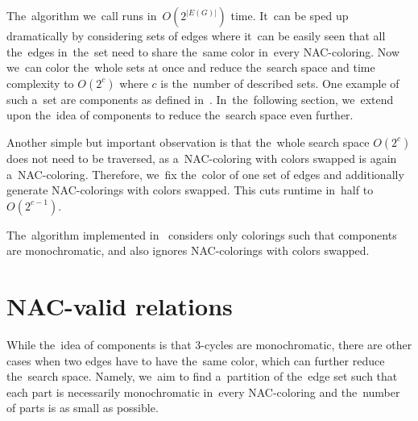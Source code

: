 The~algorithm we~call \Naive{} runs in~\( O(2^{|E(G)|}) \) time.
It~can be sped up dramatically by considering sets of edges
where it~can be easily seen that all the~edges in~the~set need to share
the~same color in~every NAC-coloring.
%
Now we~can color the~whole sets at once
and reduce the~search space and time complexity to \( O(2^{c}) \)
where \( c \) is the~number of described sets.
One example of such a~set are \trcon{} components
as defined in~.
In~the~following section, we~extend upon the~idea of \trcon{} components
to reduce the~search space even further.

Another simple but important observation is that the~whole search space \( O(2^{c}) \)
does not need to be traversed, as a~NAC-coloring with colors swapped is again a~NAC-coloring.
Therefore, we~fix the~color of one set of edges and additionally generate NAC-colorings with colors swapped.
This cuts runtime in~half%
to \( O(2^{c-1}) \).


The~algorithm implemented in~\flexrilog{}
considers only colorings such that \trcon{} components are monochromatic,
and also ignores NAC-colorings with colors swapped.

\section{NAC-valid relations}%
\label{sec:NACvalid}

While the~idea of \trcon{} components is that 3-cycles are monochromatic,
there are other cases when two edges have to have the~same color,
which can further reduce the~search space.
Namely, we~aim to find a~partition of the~edge set such that each part is necessarily monochromatic
in~every NAC-coloring and the~number of parts is as small as possible.

